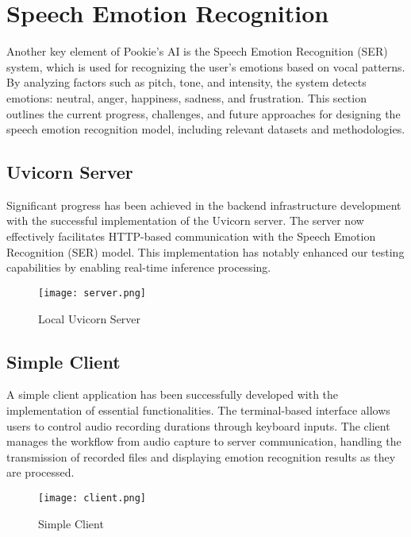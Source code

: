 \section{Speech Emotion Recognition}
Another key element of Pookie’s AI is the Speech Emotion Recognition (SER) system, which is used for recognizing the user’s emotions based on vocal patterns. By analyzing factors such as pitch, tone, and intensity, the system detects emotions: neutral, anger, happiness, sadness, and frustration. This section outlines the current progress, challenges, and future approaches for designing the speech emotion recognition model, including relevant datasets and methodologies.
\subsection{Uvicorn Server}
Significant progress has been achieved in the backend infrastructure development with the successful implementation of the Uvicorn server. The server now effectively facilitates HTTP-based communication with the Speech Emotion Recognition (SER) model. This implementation has notably enhanced our testing capabilities by enabling real-time inference processing.

\begin{figure}[ht]
    \centering
    \captionsetup{justification=centering}
    \texttt{[image: server.png]}
    \caption{Local Uvicorn Server}
    \label{fig:server}
\end{figure}

\newpage
\subsection{Simple Client}
A simple client application has been successfully developed with the implementation of essential functionalities. The terminal-based interface allows users to control audio recording durations through keyboard inputs. The client manages the workflow from audio capture to server communication, handling the transmission of recorded files and displaying emotion recognition results as they are processed.

\begin{figure}[ht]
    \centering
    \captionsetup{justification=centering}
    \texttt{[image: client.png]}
    \caption{Simple Client}
    \label{fig:client}
\end{figure}

\newpage
